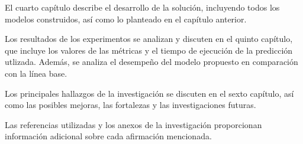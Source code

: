 El cuarto capítulo describe el desarrollo de la solución, incluyendo todos los modelos construidos, así como lo planteado en el capítulo anterior.

Los resultados de los experimentos se analizan y discuten en el quinto capítulo, que incluye los valores de las métricas y el tiempo de ejecución de la predicción utlizada. Además, se analiza el desempeño del modelo propuesto en comparación con la línea base.

Los principales hallazgos de la investigación se discuten en el sexto capítulo, así como las posibles mejoras, las fortalezas y las investigaciones futuras.

Las referencias utilizadas y los anexos de la investigación proporcionan información adicional sobre cada afirmación mencionada.